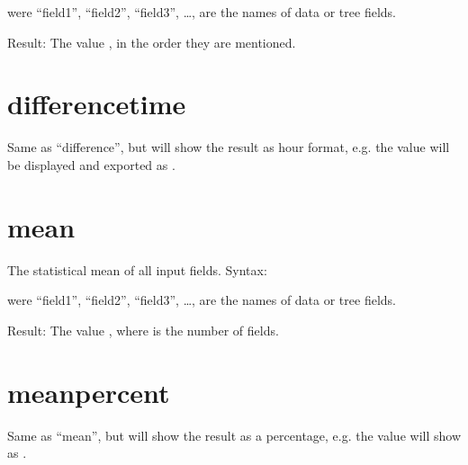 \documentclass[letterpaper,10pt,english]{sphinxmanual}
\begin{document}
\sphinxAtStartPar
were “field1”, “field2”, “field3”, …, are the names of data or tree fields.

\sphinxAtStartPar
Result: The value , in the order they are mentioned.


\section{difference\sphinxhyphen{}time}
\label{\detokenize{tree-fields:difference-time}}
\sphinxAtStartPar
Same as “difference”, but will show the result as hour format, e.g. the value  will be displayed and exported as .


\section{mean}
\label{\detokenize{tree-fields:mean}}
\sphinxAtStartPar
The statistical mean of all input fields.
Syntax:

\begin{sphinxVerbatim}[commandchars=\\\{\}]
 
     
     \PYG{p}{[}  \PYG{p}{]}
     \PYG{p}{[} \PYG{p}{]}
     \PYG{p}{[}\PYG{p}{]}
     \PYG{p}{[}\PYG{p}{]}
\end{sphinxVerbatim}

\sphinxAtStartPar
were “field1”, “field2”, “field3”, …, are the names of data or tree fields.

\sphinxAtStartPar
Result: The value , where  is the number of fields.


\section{mean\sphinxhyphen{}percent}
\label{\detokenize{tree-fields:mean-percent}}
\sphinxAtStartPar
Same as “mean”, but will show the result as a percentage, e.g. the value  will show as .
\end{document}
